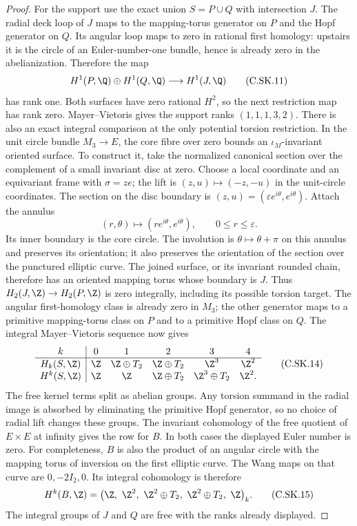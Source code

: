 \begin{proof}
For the support use the exact union
$S=P\cup Q$ with intersection $J$. The
radial deck loop of $J$ maps to the
mapping-torus generator on $P$ and the
Hopf generator on $Q$. Its angular loop
maps to zero in rational first homology:
upstairs it is the circle of an
Euler-number-one bundle, hence is already
zero in the abelianization. Therefore
the map
\[
           H^1(P,\Q)\oplus H^1(Q,\Q)
                         \longrightarrow H^1(J,\Q)
                                                            \tag{C.SK.11}
\]
has rank one. Both surfaces have zero
rational $H^2$, so the next restriction
map has rank zero. Mayer--Vietoris gives
the support ranks $(1,1,1,3,2)$.
There is also an exact integral comparison at the only
potential torsion restriction. In the unit circle bundle
$M_3\to E$, the core fibre over zero bounds an
$\iota_M$-invariant oriented surface. To construct it,
take the normalized canonical section over the complement
of a small invariant disc at zero. Choose a local
coordinate and an equivariant frame with
$\sigma=z e$; the lift is
$(z,u)\mapsto(-z,-u)$ in the unit-circle coordinates.
The section on the disc boundary is
$(z,u)=(\varepsilon e^{i\theta},e^{i\theta})$.
Attach the annulus
\[
 (r,\theta)\longmapsto(re^{i\theta},e^{i\theta}),
                 \qquad 0\le r\le\varepsilon .
\]
Its inner boundary is the core circle. The involution
is $\theta\mapsto\theta+\pi$ on this annulus and
preserves its orientation; it also preserves the
orientation of the section over the punctured elliptic
curve. The joined surface, or its invariant rounded
chain, therefore has an oriented mapping torus whose
boundary is $J$. Thus
$H_2(J,\Z)\to H_2(P,\Z)$ is zero integrally,
including its possible torsion target. The angular
first-homology class is already zero in $M_3$;
the other generator maps to a primitive mapping-torus
class on $P$ and to a primitive Hopf class on $Q$.
The integral Mayer--Vietoris sequence now gives
\[
 \begin{array}{c|ccccc}
 k&0&1&2&3&4\\ \hline
 H_k(S,\Z)&
 \Z&\Z\oplus T_2&\Z\oplus T_2&\Z^3&\Z^2\\
 H^k(S,\Z)&
 \Z&\Z&\Z\oplus T_2&\Z^3\oplus T_2&\Z^2 .
 \end{array}                                             \tag{C.SK.14}
\]
The free kernel terms split as abelian groups.
Any torsion summand in the radial image is absorbed
by eliminating the primitive Hopf generator, so
no choice of radial lift changes these groups.
The invariant cohomology of the free
quotient of $E\times E$ at infinity
gives the row for $B$. In both cases
the displayed Euler number is zero.
For completeness, $B$ is also the product of an
angular circle with the mapping torus of inversion
on the first elliptic curve. The Wang maps on
that curve are $0,-2I_2,0$. Its integral
cohomology is therefore
\[
 H^k(B,\Z)=
 \bigl(\Z,\ \Z^2,\ \Z^2\oplus T_2,\
                  \Z^2\oplus T_2,\ \Z\bigr)_k .
                                                            \tag{C.SK.15}
\]
The integral groups of $J$ and $Q$ are free with
the ranks already displayed.


\end{proof}
